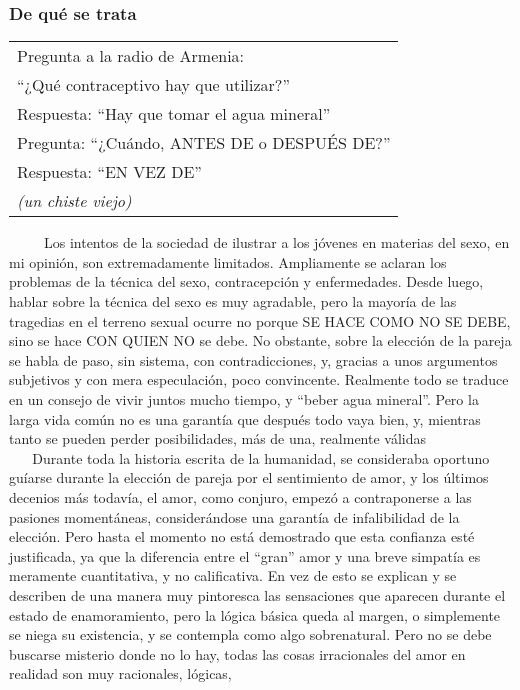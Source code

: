 \protect\hypertarget{M1}{}{}

\subsubsection{De qué se trata}\label{de-quuxe9-se-trata}

\begin{longtable}[]{@{}l@{}}
\toprule
Pregunta a la radio de Armenia:\tabularnewline
``¿Qué contraceptivo hay que utilizar?''\tabularnewline
Respuesta: ``Hay que tomar el agua mineral''\tabularnewline
Pregunta: ``¿Cuándo, ANTES DE o DESPUÉS DE?''\tabularnewline
Respuesta: ``EN VEZ DE''\tabularnewline
\emph{(un chiste viejo)}\tabularnewline
\bottomrule
\end{longtable}

~ ~ ~ Los intentos de la sociedad de ilustrar a los jóvenes en materias
del sexo, en mi opinión, son extremadamente limitados. Ampliamente se
aclaran los problemas de la técnica del sexo, contracepción y
enfermedades. Desde luego, hablar sobre la técnica del sexo es muy
agradable, pero la mayoría de las tragedias en el terreno sexual ocurre
no porque SE HACE COMO NO SE DEBE, sino se hace CON QUIEN NO se debe. No
obstante, sobre la elección de la pareja se habla de paso, sin sistema,
con contradicciones, y, gracias a unos argumentos subjetivos y con mera
especulación, poco convincente. Realmente todo se traduce en un consejo
de vivir juntos mucho tiempo, y ``beber agua mineral''. Pero la larga
vida común no es una garantía que después todo vaya bien, y, mientras
tanto se pueden perder posibilidades, más de una, realmente válidas\\
\hspace*{0.333em} ~ ~ Durante toda la historia escrita de la humanidad,
se consideraba oportuno guíarse durante la elección de pareja por el
sentimiento de amor, y los últimos decenios más todavía, el amor, como
conjuro, empezó a contraponerse a las pasiones momentáneas,
considerándose una garantía de infalibilidad de la elección. Pero hasta
el momento no está demostrado que esta confianza esté justificada, ya
que la diferencia entre el ``gran'' amor y una breve simpatía es
meramente cuantitativa, y no calificativa. En vez de esto se explican y
se describen de una manera muy pintoresca las sensaciones que aparecen
durante el estado de enamoramiento, pero la lógica básica queda al
margen, o simplemente se niega su existencia, y se contempla como algo
sobrenatural. Pero no se debe buscarse misterio donde no lo hay, todas
las cosas irracionales del amor en realidad son muy racionales, lógicas,
